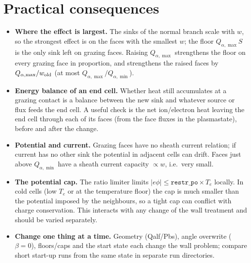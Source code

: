 \documentclass[11pt,a4paper]{article}
\newcommand{\code}[1]{{\small\path{#1}}}
\newcommand{\wrk}{w}
\newcommand{\qmin}{Q_{\alpha,\min}}
\newcommand{\qmax}{Q_{\alpha,\max}}
\begin{document}
\section{Practical consequences}\label{sec:practice}
\begin{itemize}
\item \textbf{Where the effect is largest.} The sinks of the normal branch scale with $\wrk$, so the strongest effect is on the
      faces with the smallest $\wrk$; the floor $\qmax S$ is the only sink left on grazing faces. Raising $\qmax$ strengthens
      the floor on every grazing face in proportion, and strengthens the raised faces by $\qmax/\wrk_{\rm old}$ (at most
      $\qmax/\qmin$).
\item \textbf{Energy balance of an end cell.} Whether heat still accumulates at a grazing contact is a balance between the
      new sink and whatever source or flux feeds the end cell. A useful check is the net ion/electron heat leaving the end cell
      through each of its faces (from the face fluxes in the plasmastate), before and after the change.
\item \textbf{Potential and current.} Grazing faces have no sheath current relation; if current has no other sink the potential in
      adjacent cells can drift. Faces just above $\qmin$ have a sheath current capacity $\propto\wrk$, i.e.\ very small.
\item \textbf{The potential cap.} The ratio limiter \code{b2nppo_restr_po} limits $|e\phi|\le\texttt{restr\_po}\times T_e$ locally. In cold cells
      (low $T_e$ or at the temperature floor) the cap is much smaller than the potential imposed by the neighbours, so a tight cap
      can conflict with charge conservation. This interacts with any change of the wall treatment and should be
      varied separately.
\item \textbf{Change one thing at a time.} Geometry (Qalf/Pbs), angle overwrite ($\beta=0$), floors/caps and the start state
      each change the wall problem; compare short start-up runs from the same state in separate run directories.
\end{itemize}

\end{document}
